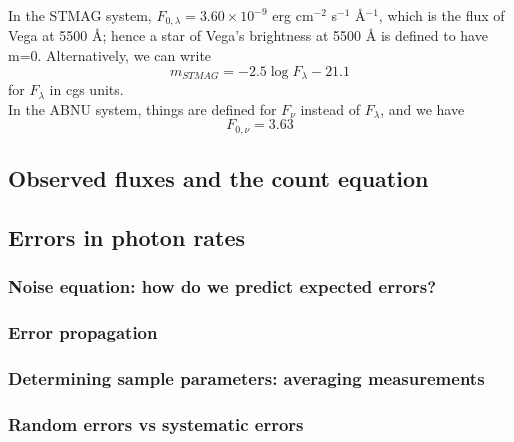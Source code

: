 \documentclass[12pt]{article}
\begin{document}
\noindent In the STMAG system, $F_{0,\lambda} = 3.60 \times 10^{-9}$
erg cm$^{-2}$ s$^{-1}$ \AA{}$^{-1}$, which is the flux of Vega at
5500 \AA{}; hence a star of Vega's brightness at 5500 \AA{} is defined to
have m=0. Alternatively, we can write
\begin{equation*}
    m_{STMAG} = -2.5 \log F_{\lambda} - 21.1
\end{equation*}
for $F_{\lambda}$ in cgs units.\\

\noindent In the ABNU system, things are defined for $F_{\nu}$ instead of
$F_{\lambda}$, and we have
\begin{equation*}
    F_{0,\nu} = 3.63
\end{equation*}



\subsection*{Observed fluxes and the count equation}
\subsection*{Errors in photon rates}
\subsubsection*{Noise equation: how do we predict expected errors?}
\subsubsection*{Error propagation}
\subsubsection*{Determining sample parameters: averaging measurements}
\subsubsection*{Random errors vs systematic errors}
\end{document}
